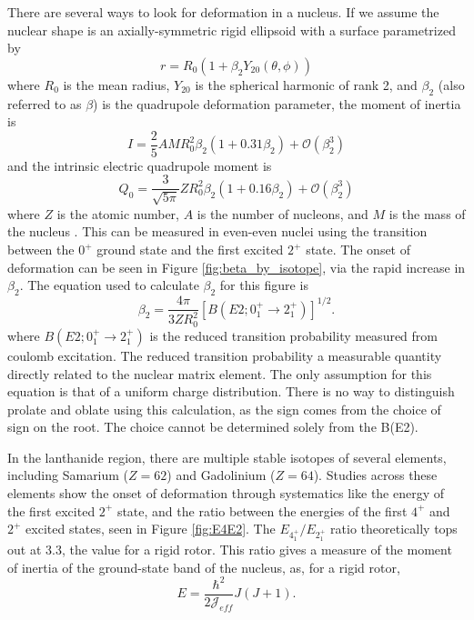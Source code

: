 

There are several ways to look for deformation in a nucleus. If we assume the nuclear shape is an axially-symmetric rigid ellipsoid with a surface parametrized by
\begin{equation}
    r = R_0(1+\beta_2 Y_{20}(\theta,\phi))
\end{equation}
where $R_0$ is the mean radius, $Y_{20}$ is the spherical harmonic of rank 2, and $\beta_2$ (also referred to as $\beta$) is the quadrupole deformation parameter, the moment of inertia is
\begin{equation}
    I = \frac{2}{5}AMR_0^2\beta_2\left(1+0.31\beta_2\right)+\mathscr{O}(\beta_2^3)
\end{equation}
and the intrinsic electric quadrupole moment is 
\begin{equation}
    Q_0 = \frac{3}{\sqrt{5\pi}}ZR_0^2\beta_2\left(1+0.16\beta_2\right)+\mathscr{O}(\beta_2^3)
\end{equation}
where $Z$ is the atomic number, $A$ is the number of nucleons, and $M$ is the mass of the nucleus \citep{casten90:_structure}. This can be measured in even-even nuclei using the transition between the $0^+$ ground state and the first excited $2^+$ state. The onset of deformation can be seen in Figure \ref{fig:beta_by_isotope}, via the rapid increase in $\beta_2$. The equation used to calculate $\beta_2$ for this figure is 
\begin{equation}
    \beta_2 = \frac{4\pi}{3ZR^2_0}\left[B(E2;0^+_1\rightarrow2^+_1)\right]^{1/2}.
\end{equation}
where $B(E2;0^+_1\rightarrow2^+_1)$ is the reduced transition probability measured from coulomb excitation. The reduced transition probability a measurable quantity directly related to the nuclear matrix element. The only assumption for this equation is that of a uniform charge distribution\citep{raman01:_be2}. There is no way to distinguish prolate and oblate using this calculation, as the sign comes from the choice of sign on the root. The choice cannot be determined solely from the B(E2).



In the lanthanide region, there are multiple stable isotopes of several elements, including Samarium ($Z=62$) and Gadolinium ($Z=64$). Studies across these elements show the onset of deformation through systematics like the energy of the first excited $2^+$ state, and the ratio between the energies of the first $4^+$ and $2^+$ excited states, seen in Figure \ref{fig:E4E2}. The $E_{4^+_1}/E_{2^+_1}$ ratio theoretically tops out at 3.3, the value for a rigid rotor. This ratio gives a measure of the moment of inertia of the ground-state band of the nucleus, as, for a rigid rotor,
\begin{equation}
    E=\frac{\hbar^2}{2\mathscr{J}_{eff}}J(J+1).
\end{equation}

